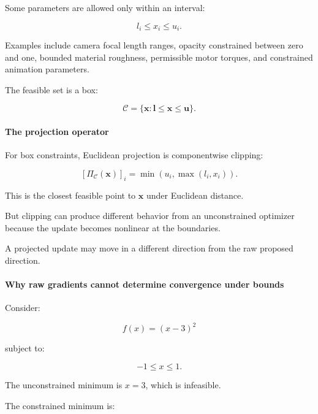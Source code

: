 \hypertarget{02-foundations-ii-ch027-optimization-under-bounds}{}

Some parameters are allowed only within an interval:

\[
l_i\le x_i\le u_i.
\]

Examples include camera focal length ranges, opacity constrained between zero and one, bounded material roughness, permissible motor torques, and constrained animation parameters.

The feasible set is a box:

\[
\mathcal C= \{\mathbf x:\mathbf l\le\mathbf x\le\mathbf u\}.
\]

\paragraph{The projection operator}\label{02-foundations-ii-ch027-the-projection-operator}

\hypertarget{02-foundations-ii-ch027-the-projection-operator}{}

For box constraints, Euclidean projection is componentwise clipping:

\[
\boxed{ [\Pi_{\mathcal C}(\mathbf x)]_i = \min(u_i,\max(l_i,x_i)) }.
\]

This is the closest feasible point to \(\mathbf x\) under Euclidean distance.

But clipping can produce different behavior from an unconstrained optimizer because the update becomes nonlinear at the boundaries.

A projected update may move in a different direction from the raw proposed direction.

\paragraph{Why raw gradients cannot determine convergence under bounds}\label{02-foundations-ii-ch027-why-raw-gradients-cannot-determine-convergence-under-bounds}

\hypertarget{02-foundations-ii-ch027-why-raw-gradients-cannot-determine-convergence-under-bounds}{}

Consider:

\[
f(x)=(x-3)^2
\]

subject to:

\[
-1\le x\le1.
\]

The unconstrained minimum is \(x=3\), which is infeasible.

The constrained minimum is:

